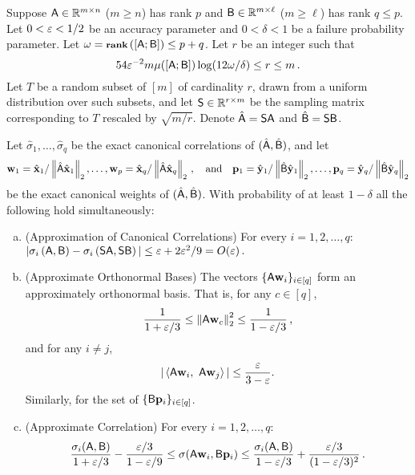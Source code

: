 \begin{theorem}\label{thm1}
Suppose ${\mathsf{A} } \in \mathbb{R}^{m \times n}$ ($m \geq n$) has rank $p$ and ${\mathsf{B} } \in \mathbb{R}^{m \times \ell}$ ($m \geq \ell$) has rank $q \le p$. Let $0 < \varepsilon < 1/2$ be an accuracy parameter and $0 < \delta < 1$ be a failure probability parameter. Let $\omega = \operatorname{\textbf{{\footnotesize rank}}}\left([{\mathsf{A} } ; {\mathsf{B} }]\right) \leq p+q$. Let $r$ be an integer such that
\[
54 \varepsilon^{-2} m  \mu([{\mathsf{A} } ; {\mathsf{B} }]) \log ( 12 \omega /\delta) \leq r \leq m \,.
\]
Let $T$ be a random subset of $[m]$ of cardinality $r$, drawn from a uniform distribution over such subsets,
and let ${\mathsf{S} } \in \mathbb{R}^{r \times m}$ be the sampling matrix corresponding to $T$ rescaled by $\sqrt{m/r}$.
Denote $\hat{{\mathsf{A} }} = {\mathsf{S} } {\mathsf{A} }$ and $\hat{{\mathsf{B} }} = {\mathsf{S} }  {\mathsf{B} }$.

Let $\hat{\sigma}_1,\dots,\hat{\sigma}_q$  be the exact canonical correlations of $(\hat{{\mathsf{A} }}, \hat{{\mathsf{B} }})$,
and let
\[
{\mathbf{w}}_1=\hat{\mathbf{x}}_1 / \left\|\hat{{\mathsf{A} }} \hat{\mathbf{x}}_1\right\|_2, \dots, {\mathbf{w}}_p=\hat{\mathbf{x}}_q / \left\|\hat{{\mathsf{A} }} \hat{\mathbf{x}}_q\right\|_2\,,
\quad \text{and}\quad
{\mathbf p}_1=\hat{\mathbf{y}}_1 / \left\|\hat{{\mathsf{B} }} \hat{\mathbf{y}}_1\right\|_2, \dots, {\mathbf p}_q = \hat{\mathbf{y}}_q / \left\|\hat{{\mathsf{B} }} \hat{\mathbf{y}}_q\right\|_2
\]
be the exact canonical weights of $(\hat{{\mathsf{A} }}, \hat{{\mathsf{B} }})$. With probability of at least $1-\delta$ all the following hold simultaneously:
\begin{enumerate}[(a)]
    \item
    (Approximation of Canonical Correlations) For every $i=1,2,\ldots ,q$: $ | \sigma_i\left({\mathsf{A} }, {\mathsf{B} } \right) - \sigma_i\left( {\mathsf{S} } {\mathsf{A} }, {\mathsf{S} }  {\mathsf{B} } \right)| \le  \varepsilon + 2\varepsilon^2 / 9 = O(\varepsilon)\,.$
	\item
	(Approximate Orthonormal Bases) The vectors $\{{\mathsf{A} } {\mathbf{w}}_i\}_{i\in{[q]}}$ form an approximately orthonormal basis. That is,
    for any $c \in [q]$,
%
\[\frac{1}{1+\varepsilon/3} \leq \left\|{\mathsf{A} } {\mathbf{w}}_c\right\|_2^2 \leq \frac{1}{1-\varepsilon/3}\,,\]
%
and for any $i\neq j$,
\[|
\left\langle { {\ensuremath{\mathsf{A} }}{\mathbf{w}}_i},\ { {\mathsf{A} } {\mathbf{w}}_j} \right\rangle| \leq \frac{\varepsilon}{3 - \varepsilon}.
\]
Similarly, for the set of $\{{\mathsf{B} } {\mathbf p}_i\}_{i\in{[q]}}$.
	\item
(Approximate Correlation) For every $i=1,2,\ldots ,q$:
\[
\frac{\sigma_i({\mathsf{A} },{\mathsf{B} })}{1+\varepsilon/3} - \frac{\varepsilon/3}{1-\varepsilon/9} \leq \sigma({\mathsf{A} } {\mathbf{w}}_i, {\mathsf{B} } {\mathbf p}_i) \leq \frac{\sigma_i({\mathsf{A} },{\mathsf{B} })}{1-\varepsilon/3} + \frac{\varepsilon/3}{(1-\varepsilon/3)^2}\,.
\]
\end{enumerate}
\end{theorem}
%
%
